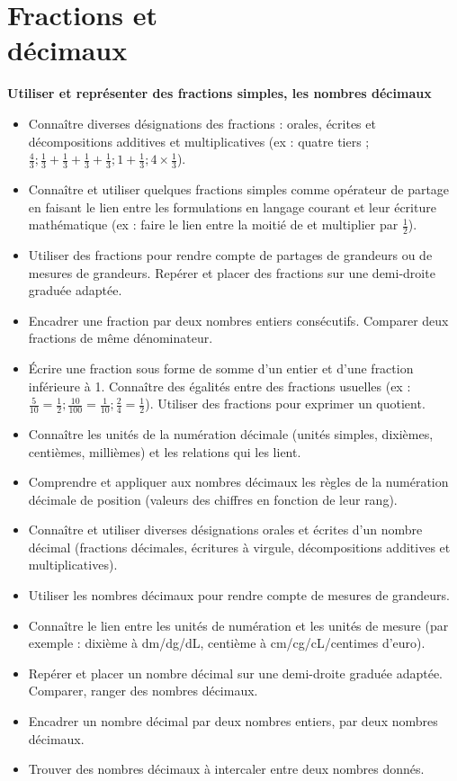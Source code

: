 \chapter{Fractions et\\décimaux} \label{Num4}
 
 
\begin{prerequis}
{\bf Utiliser et représenter des fractions simples, les nombres décimaux}
   \begin{itemize}
      \item Connaître diverses désignations des fractions : orales, écrites et décompositions additives et multiplicatives (ex : quatre tiers ; $\frac 43 ; \frac13+\frac13+\frac13+\frac13 ; 1+\frac13 ; 4 \times \frac13$).
      \item Connaître et utiliser quelques fractions simples comme opérateur de partage en faisant le lien entre les formulations en langage courant et leur écriture mathématique (ex : faire le lien entre \og la moitié de \fg{} et multiplier par $\frac12$).
      \item Utiliser des fractions pour rendre compte de partages de grandeurs ou de mesures de grandeurs. Repérer et placer des fractions sur une demi-droite graduée adaptée.
      \item Encadrer une fraction par deux nombres entiers consécutifs. Comparer deux fractions de même dénominateur.
      \item Écrire une fraction sous forme de somme d’un entier et d’une fraction inférieure à 1. Connaître des égalités entre des fractions usuelles (ex : $\frac5{10} =\frac12 ; \frac{10}{100} =\frac1{10} ; \frac24 =\frac12$). Utiliser des fractions pour exprimer un quotient.
      \item Connaître les unités de la numération décimale (unités simples, dixièmes, centièmes, millièmes) et les relations qui les lient.
      \item Comprendre et appliquer aux nombres décimaux les règles de la numération décimale de position (valeurs des chiffres en fonction de leur rang).
      \item Connaître et utiliser diverses désignations orales et écrites d’un nombre décimal (fractions décimales, écritures à virgule, décompositions additives et multiplicatives).
      \item Utiliser les nombres décimaux pour rendre compte de mesures de grandeurs.
      \item Connaître le lien entre les unités de numération et les unités de mesure (par exemple : dixième à dm/dg/dL, centième à cm/cg/cL/centimes d’euro).
      \item Repérer et placer un nombre décimal sur une demi-droite graduée adaptée. Comparer, ranger des nombres décimaux.
      \item Encadrer un nombre décimal par deux nombres entiers, par deux nombres décimaux.
      \item Trouver des nombres décimaux à intercaler entre deux nombres donnés.
   \end{itemize}
\end{prerequis}


